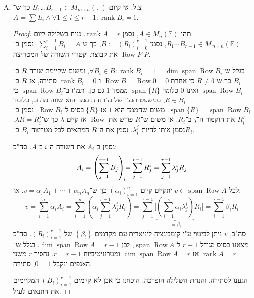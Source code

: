 \documentclass[]{article}
\newcommand\F         {\mathbb{F}}
\newcommand\co        {\colon}
\DeclareMathOperator{\Sp}     {span}
\DeclareMathOperator{\rk}     {rank}
\DeclareMathOperator{\rows}   {Row}
\newcommand\ag        {\alpha}
\newcommand\bg        {\beta}
\renewcommand\lg      {\lambda}
\newcommand\cl [1]    {\left ( #1 \right )}
\begin{document}
\begin{enumerate}[A)]
\begin{proof}
\begin{itemize}
\begin{itemize}
\begin{enumerate}
					\end{enumerate}
				\end{itemize}
				סה"כ הוכחנו שאכן לסכום שוויון ל־$A$, וה־$\rk$ של כל מטריצה בסכום הוא $1$. 
			\end{itemize}
			משהוכח לעיל ובגלל ש־$|(P_i)_{i = 0}^r| = r$, הוכחנו את הדרוש, ו־$(P_i)$ הסדרה המבוקשת. 			
		\end{proof}
		\item צ.ל. אי קיום $B_1 \dots B_{r - 1} \in M_{m \times n}(\F)$ כך ש־$A = \sum B_i \land \forall 1 \le i \le r - 1 \co \rk B_i = 1$. 
		\begin{proof}
			תהי $A \in M_n(\F)$, נסמן $\rk A = r$. נניח בשלילה קיום $B_1 \cdots B_{r - 1} \in M_{m \times n}(\F)$, נסמן $B := (B_i)_{i = 0}^{r - 1}$, כך ש־$\sum_{i =1}^{r - 1}B_i = A$. 
	נסמן ב־$\rows P$ את קבוצת וקטורי השורה של המטריצה $P$. 
	
	בגלל ש־$\forall B_i \in B \co \rk B_i = 1 = \dim \Sp \rows B_i$, ומשום שקיימת שורה $R$ ב־$B_i$ כך ש־$R \neq 0$ כי אחרת $\rows B = \rows 0 = 0$ ו־$\rk B_i = 0$ סתירה, אז $R$ ב־$\Sp \rows B_i$ ואינו $0$ כלומר $\Sp\{R\}$ מממד $1$ גם כן, ותמ"ו ב־$\Sp\rows B_i$ כי $R \in B_i$, ממשפט תמ"ו של מ"ו זהה ממד הוא שווה מרחב, כלומר $\Sp \{R\} = \Sp \rows B_i$. משום שהממד הוא $1$ אז $\{R\}$ בסיס ל־$\rows B_i$. נסמן ב־$R^j_i$ את הוקטור ה־$j$ ב־$R_i$. אז משום ש־$R$ פורש את $\rows$ אז קיים $\lg$ כך ש־$\lg R = R^j_i$. נסמן אותו להיות $\lg_i^j$. נסמן את ה־$R$ המתאים לכל מטריצה $B_i$ ב־$R_i$. 
	
	נסמן ב־$A_i$ את השורה ה־$i$ ב־$A$. סה"כ: 
	\[ A_i = \cl{\sum_{j = 1}^{r - 1}B_j}_{\mathclap{i}} \!= \sum_{j = 1}^{r - 1}R^i_j = \sum_{j = 1}^{r - 1} \lg^{i}_jR_j \]
	לכל $v \in \Sp \rows A$ יתקיים קיום $(\ag_i)_{i = 1}^{n}$ כך ש־$v = \ag_1 A_1 + \cdots + \ag_nA_n$. אז: 
	\[ v = \sum_{i = 1}^{n}\ag_iA_i = \sum_{i = 1}^{n}\cl{\ag_i\sum_{j = 1}^{r - 1}\lg^{i}_jR_i}
	=\sum_{j = 1}^{r - 1}\Bigg[\underbrace{\cl{\sum_{i = 1}^{n}\ag_i\lg^i_j}}_{:= \bg_i}R_i \Bigg] = \sum_{i = 1}^{r - 1}\bg_iR_i
	 \]
	 סה"כ, $v$ ניתן לביטוי ע"י קומבינציה ליניארית עם מקדמים $(\bg_i)$ של $(R_i)_{i = 1}^{r - 1}$. סה"כ מצאנו בסיס מגודל $r - 1$ ל־$\Sp\rows A$, לכן $\dim \Sp\rows A = r - 1$. בגלל ש־$\rk A = r$ אז $\dim \Sp \rows A =r$ ומטרנזיטיביות $r = r - 1$. נחסיר $r$ משני האגפים ונקבל $0 = 1$, סתירה. 
	 
	 הגענו לסתירה, והנחת השלילה הופרכה. הוכחנו כי אכן לא קיימים $(B_i)_{i = 1}^{r - 1}$ המקיימים את התנאים לעיל. 
	
		\end{proof}
	\end{enumerate}
	
\end{document}
